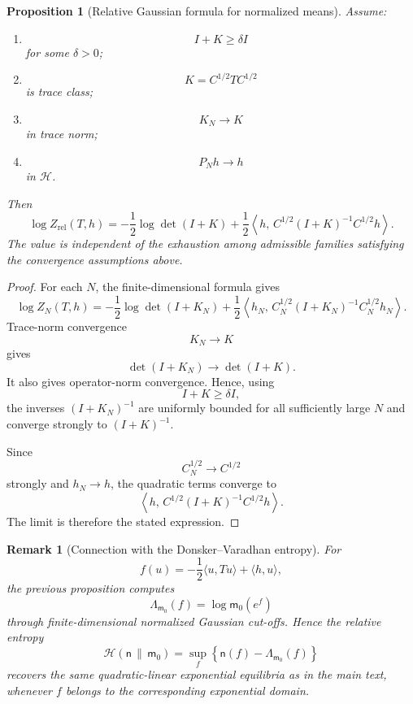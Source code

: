 \documentclass[11pt,reqno]{amsart}
\newtheorem{Proposition}[Theorem]{Proposition}
\newtheorem{rem}[Theorem]{Remark}
\begin{document}
\begin{Proposition}[Relative Gaussian formula for normalized means]
\label{prop:normalized-mean-gauss}
Assume:
\begin{enumerate}
\item
\[
I+K\geq\delta I
\]
for some $\delta>0$;

\item
\[
K=C^{1/2}TC^{1/2}
\]
is trace class;

\item
\[
K_N\longrightarrow K
\]
in trace norm;

\item
\[
P_Nh\longrightarrow h
\]
in $\mathcal H$.
\end{enumerate}
Then
\[
\boxed{
\log Z_{\mathrm{rel}}(T,h)
=
-\frac12\log\det(I+K)
+
\frac12
\left\langle
h,\,
C^{1/2}(I+K)^{-1}C^{1/2}h
\right\rangle.
}
\]
The value is independent of the exhaustion among admissible families
satisfying the convergence assumptions above.
\end{Proposition}

\begin{proof}
For each $N$, the finite-dimensional formula gives
\[
\log Z_N(T,h)
=
-\frac12\log\det(I+K_N)
+
\frac12
\left\langle
h_N,\,
C_N^{1/2}(I+K_N)^{-1}C_N^{1/2}h_N
\right\rangle.
\]
Trace-norm convergence
\[
K_N\longrightarrow K
\]
gives
\[
\det(I+K_N)\longrightarrow\det(I+K).
\]
It also gives operator-norm convergence. Hence, using
\[
I+K\geq\delta I,
\]
the inverses $(I+K_N)^{-1}$ are uniformly bounded for all sufficiently
large $N$ and converge strongly to $(I+K)^{-1}$.

Since
\[
C_N^{1/2}\longrightarrow C^{1/2}
\]
strongly and $h_N\to h$, the quadratic terms converge to
\[
\left\langle
h,\,
C^{1/2}(I+K)^{-1}C^{1/2}h
\right\rangle.
\]
The limit is therefore the stated expression.
\end{proof}

\begin{rem}[Connection with the Donsker--Varadhan entropy]
For
\[
f(u)
=
-\frac12\langle u,Tu\rangle+\langle h,u\rangle,
\]
the previous proposition computes
\[
\Lambda_{\mathsf m_0}(f)
=
\log\mathsf m_0(e^f)
\]
through finite-dimensional normalized Gaussian cut-offs. Hence the
relative entropy
\[
\mathcal H(\mathsf n\,\|\,\mathsf m_0)
=
\sup_f
\left\{
\mathsf n(f)-\Lambda_{\mathsf m_0}(f)
\right\}
\]
recovers the same quadratic-linear exponential equilibria as in the
main text, whenever $f$ belongs to the corresponding exponential
domain.
\end{rem}
\end{document}
